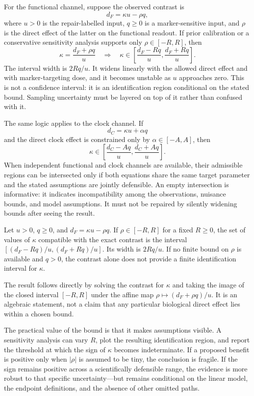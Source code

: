 \documentclass[10pt,a4paper]{article}
\begin{document}
For the functional channel, suppose the observed contrast is
\[
d_F=\kappa u-\rho q,
\]
where \(u>0\) is the repair-labelled input, \(q\geq 0\) is a marker-sensitive input, and \(\rho\) is the direct effect of the latter on the functional readout. If prior calibration or a conservative sensitivity analysis supports only \(\rho\in[-R,R]\), then
\[
\kappa=\frac{d_F+\rho q}{u}
\quad\Longrightarrow\quad
\kappa\in\left[\frac{d_F-Rq}{u},\frac{d_F+Rq}{u}\right].
\]
The interval width is \(2Rq/u\). It widens linearly with the allowed direct effect and with marker-targeting dose, and it becomes unstable as \(u\) approaches zero. This is not a confidence interval: it is an identification region conditional on the stated bound. Sampling uncertainty must be layered on top of it rather than confused with it.

The same logic applies to the clock channel. If
\[
d_C=\kappa u+\alpha q
\]
and the direct clock effect is constrained only by \(\alpha\in[-A,A]\), then
\[
\kappa\in\left[\frac{d_C-Aq}{u},\frac{d_C+Aq}{u}\right].
\]
When independent functional and clock channels are available, their admissible regions can be intersected only if both equations share the same target parameter and the stated assumptions are jointly defensible. An empty intersection is informative: it indicates incompatibility among the observations, nuisance bounds, and model assumptions. It must not be repaired by silently widening bounds after seeing the result.

\begin{tcolorbox}[colback=mist,colframe=ink,title=Proposition 3 — bounded direct-effect sensitivity]
Let \(u>0\), \(q\geq0\), and \(d_F=\kappa u-\rho q\). If \(\rho\in[-R,R]\) for a fixed \(R\geq0\), the set of values of \(\kappa\) compatible with the exact contrast is the interval \([(d_F-Rq)/u,(d_F+Rq)/u]\). Its width is \(2Rq/u\). If no finite bound on \(\rho\) is available and \(q>0\), the contrast alone does not provide a finite identification interval for \(\kappa\).
\end{tcolorbox}
The result follows directly by solving the contrast for \(\kappa\) and taking the image of the closed interval \([-R,R]\) under the affine map \(\rho\mapsto(d_F+\rho q)/u\). It is an algebraic statement, not a claim that any particular biological direct effect lies within a chosen bound.

The practical value of the bound is that it makes assumptions visible. A sensitivity analysis can vary \(R\), plot the resulting identification region, and report the threshold at which the sign of \(\kappa\) becomes indeterminate. If a proposed benefit is positive only when \(|\rho|\) is assumed to be tiny, the conclusion is fragile. If the sign remains positive across a scientifically defensible range, the evidence is more robust to that specific uncertainty—but remains conditional on the linear model, the endpoint definitions, and the absence of other omitted paths.
\end{document}
